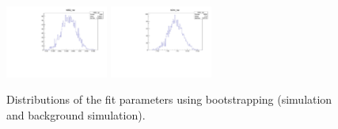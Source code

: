 \begin{figure}[tb]
\begin{center}
	\includegraphics[width=0.3\textwidth]{figs/MCwBkgVars/DG_var.pdf}
	\includegraphics[width=0.3\textwidth]{figs/MCwBkgVars/Dm_var.pdf}
   \end{center}
   \caption{
	Distributions of the fit parameters using bootstrapping (simulation and background simulation).
   }
   \label{fig:Vars_MCwBkg}
\end{figure}

